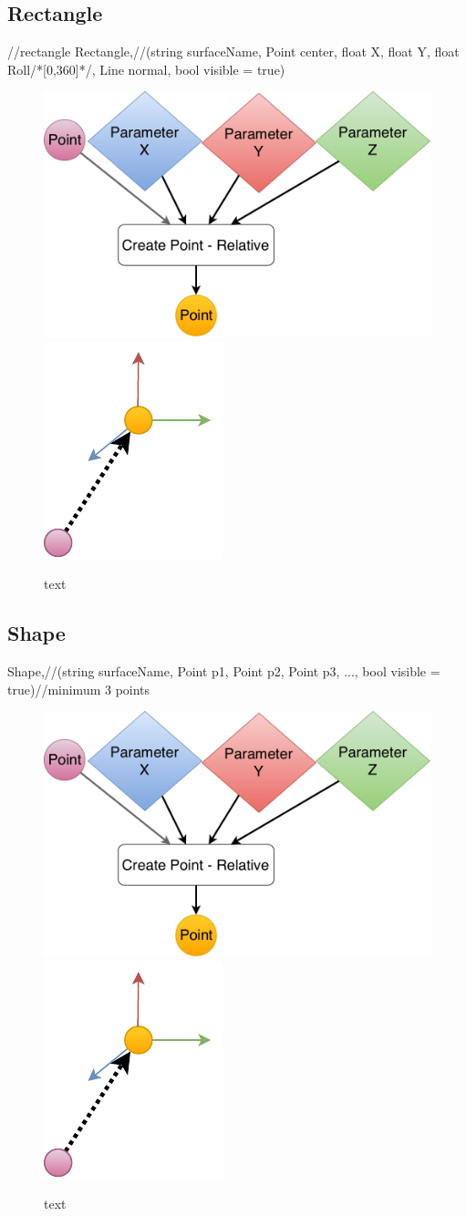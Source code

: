 \subsection{Rectangle}
	//rectangle
	Rectangle,//(string surfaceName, Point center, float X, float Y, float Roll/*[0,360]*/, Line normal, bool visible = true)

\begin{figure}[H]
	\centering
	\includegraphics[height=0.3\textwidth]{obrazky-figures/Diagram/DP Navrh operacii-0D - Point2.pdf}
	\includegraphics[height=0.3\textwidth]{obrazky-figures/Diagram/Draw/1Points/DP Navrh operacii-0D - PointRelative.pdf}
	\caption{text}
	\label{fig:1}
\end{figure}


\subsection{Shape}
	Shape,//(string surfaceName, Point p1, Point p2, Point p3, ..., bool visible = true)//minimum 3 points 

\begin{figure}[H]
	\centering
	\includegraphics[height=0.3\textwidth]{obrazky-figures/Diagram/DP Navrh operacii-0D - Point2.pdf}
	\includegraphics[height=0.3\textwidth]{obrazky-figures/Diagram/Draw/1Points/DP Navrh operacii-0D - PointRelative.pdf}
	\caption{text}
	\label{fig:1}
\end{figure}



